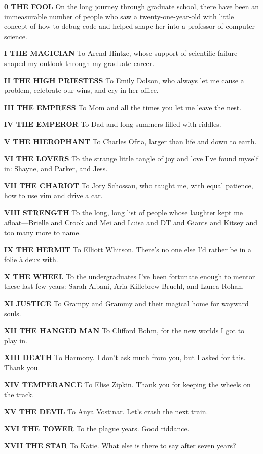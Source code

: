 \textbf{0 THE FOOL} On the long journey through graduate school, there have been an immeasurable number of people who saw a twenty-one-year-old with little concept of how to debug code and helped shape her into a professor of computer science.

\textbf{I THE MAGICIAN} To Arend Hintze, whose support of scientific failure shaped my outlook through my graduate career. 

\textbf{II THE HIGH PRIESTESS} To Emily Dolson, who always let me cause a problem, celebrate our wins, and cry in her office.

\textbf{III THE EMPRESS} To Mom and all the times you let me leave the nest.

\textbf{IV THE EMPEROR} To Dad and long summers filled with riddles.

\textbf{V THE HIEROPHANT} To Charles Ofria, larger than life and down to earth.

\textbf{VI THE LOVERS} To the strange little tangle of joy and love I've found myself in: Shayne, and Parker, and Jess. 

\textbf{VII THE CHARIOT} To Jory Schossau, who taught me, with equal patience, how to use vim and drive a car.

\textbf{VIII STRENGTH} To the long, long list of people whose laughter kept me afloat---Brielle and Crook and Mei and Luisa and DT and Giants and Kitsey and too many more to name. 

\textbf{IX THE HERMIT} To Elliott Whitson. There's no one else I'd rather be in a folie \`a deux with.

\textbf{X THE WHEEL} To the undergraduates I've been fortunate enough to mentor these last few years: Sarah Albani, Aria Killebrew-Bruehl, and Lanea Rohan.

\textbf{XI JUSTICE} To Grampy and Grammy and their magical home for wayward souls.

\textbf{XII THE HANGED MAN} To Clifford Bohm, for the new worlds I got to play in.

\textbf{XIII DEATH} To Harmony. I don't ask much from you, but I asked for this. Thank you.

\textbf{XIV TEMPERANCE} To Elise Zipkin. Thank you for keeping the wheels on the track.

\textbf{XV THE DEVIL} To Anya Vostinar. Let's crash the next train.

\textbf{XVI THE TOWER} To the plague years. Good riddance.

\textbf{XVII THE STAR} To Katie. What else is there to say after seven years?

